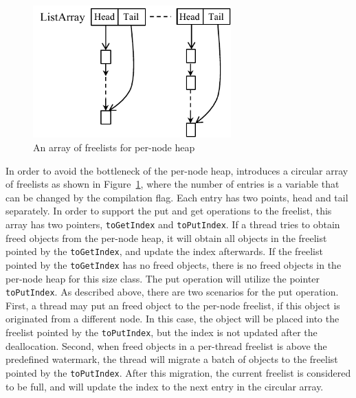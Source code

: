 \begin{figure}
\centering
\includegraphics[width=3in]{figure/listarray}
\vspace{-0.1in}
\caption{An array of freelists for per-node heap\label{fig:listarray}}
\vspace{-0.2in}
\end{figure}
In order to avoid the bottleneck of the per-node heap, \NM{} introduces a circular array of freelists as shown in Figure~\ref{fig:listarray}, where the number of entries is a variable that can be changed by the compilation flag. Each entry has two points, head and tail separately. In order to support the put and get operations to the freelist, this array has two pointers, \texttt{toGetIndex} and  \texttt{toPutIndex}. If a thread tries to obtain freed objects from the per-node heap, it will obtain all objects in the freelist pointed by the \texttt{toGetIndex}, and update the index afterwards. If the freelist pointed by the \texttt{toGetIndex} has no freed objects, there is no freed objects in the per-node heap for this size class.  The put operation will utilize the pointer \texttt{toPutIndex}. As described above, there are two scenarios for the put operation. First, a thread may put an freed object to the per-node freelist, if this object is originated from a different node. In this case, the object will be placed into the freelist pointed by the \texttt{toPutIndex}, but the index is not updated after the deallocation. Second, when freed objects in a per-thread freelist is above the predefined watermark, the thread will migrate a batch of objects to the freelist pointed by the \texttt{toPutIndex}. After this migration, the current freelist is considered to be full, and will update the index to the next entry in the circular array.

   

 

